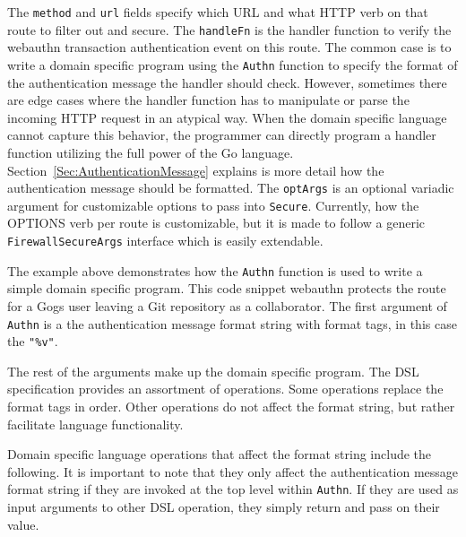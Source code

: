 
The \lstinline{method} and \lstinline{url} fields specify which URL and what HTTP verb on that route to filter out and secure. The \lstinline{handleFn} is the handler function to verify the webauthn transaction authentication event on this route. The common case is to write a domain specific program using the \lstinline{Authn} function to specify the format of the authentication message the handler should check. However, sometimes there are edge cases where the handler function has to manipulate or parse the incoming HTTP request in an atypical way. When the domain specific language cannot capture this behavior, the programmer can directly program a handler function utilizing the full power of the Go language. Section~\ref{Sec:AuthenticationMessage} explains is more detail how the authentication message should be formatted. The \lstinline{optArgs} is an optional variadic argument for customizable options to pass into \lstinline{Secure}. Currently, how the OPTIONS verb per route is customizable, but it is made to follow a generic \lstinline{FirewallSecureArgs} interface which is easily extendable. 

The example above demonstrates how the \lstinline{Authn} function is used to write a simple domain specific program. This code snippet webauthn protects the route for a Gogs user leaving a Git repository as a collaborator. The first argument of \lstinline{Authn} is a the authentication message format string with format tags, in this case the \lstinline{"%v"}. 

The rest of the arguments make up the domain specific program. The DSL specification provides an assortment of operations. Some operations replace the format tags in order. Other operations do not affect the format string, but rather facilitate language functionality. 

Domain specific language operations that affect the format string include the following. It is important to note that they only affect the authentication message format string if they are invoked at the top level within \lstinline{Authn}. If they are used as input arguments to other DSL operation, they simply return and pass on their value.

